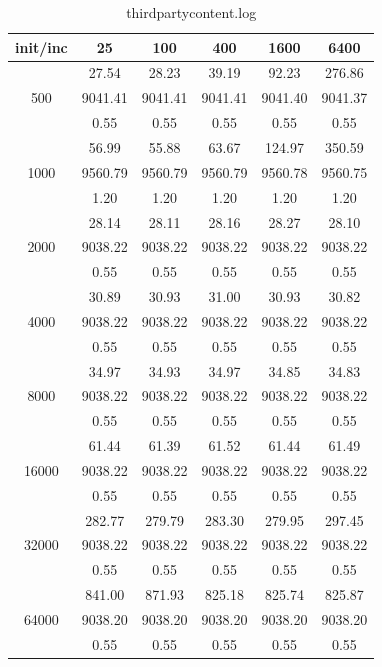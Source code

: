 {\begin{table}[th]
\caption{thirdpartycontent.log}
\label{tab:thirdpartycontent.log}
\centering
\begin{tabular}{|c||c|c|c|c|c|}
\hline
init/inc & 25 & 100 & 400 & 1600 & 6400 \\ \hline \hline
  & 27.54 & 28.23 & 39.19 & 92.23 & 276.86\\ 
500  & 9041.41 & 9041.41 & 9041.41 & 9041.40 & 9041.37\\ 
  & 0.55 & 0.55 & 0.55 & 0.55 & 0.55\\ \hline 
  & 56.99 & 55.88 & 63.67 & 124.97 & 350.59\\ 
1000  & 9560.79 & 9560.79 & 9560.79 & 9560.78 & 9560.75\\ 
  & 1.20 & 1.20 & 1.20 & 1.20 & 1.20\\ \hline 
  & 28.14 & 28.11 & 28.16 & 28.27 & 28.10\\ 
2000  & 9038.22 & 9038.22 & 9038.22 & 9038.22 & 9038.22\\ 
  & 0.55 & 0.55 & 0.55 & 0.55 & 0.55\\ \hline 
  & 30.89 & 30.93 & 31.00 & 30.93 & 30.82\\ 
4000  & 9038.22 & 9038.22 & 9038.22 & 9038.22 & 9038.22\\ 
  & 0.55 & 0.55 & 0.55 & 0.55 & 0.55\\ \hline 
  & 34.97 & 34.93 & 34.97 & 34.85 & 34.83\\ 
8000  & 9038.22 & 9038.22 & 9038.22 & 9038.22 & 9038.22\\ 
  & 0.55 & 0.55 & 0.55 & 0.55 & 0.55\\ \hline 
  & 61.44 & 61.39 & 61.52 & 61.44 & 61.49\\ 
16000  & 9038.22 & 9038.22 & 9038.22 & 9038.22 & 9038.22\\ 
  & 0.55 & 0.55 & 0.55 & 0.55 & 0.55\\ \hline 
  & 282.77 & 279.79 & 283.30 & 279.95 & 297.45\\ 
32000  & 9038.22 & 9038.22 & 9038.22 & 9038.22 & 9038.22\\ 
  & 0.55 & 0.55 & 0.55 & 0.55 & 0.55\\ \hline 
  & 841.00 & 871.93 & 825.18 & 825.74 & 825.87\\ 
64000  & 9038.20 & 9038.20 & 9038.20 & 9038.20 & 9038.20\\ 
  & 0.55 & 0.55 & 0.55 & 0.55 & 0.55\\ \hline 
\end{tabular}
\end{table}
}%

